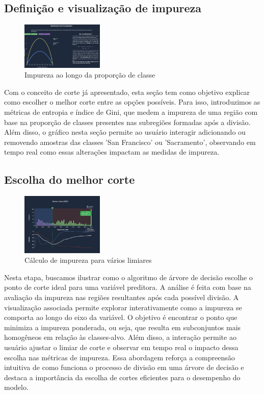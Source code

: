 \documentclass[conference]{IEEEtran}
\begin{document}
\subsection{Definição e visualização de impureza}
\begin{figure}[h]
    \centering
    \includegraphics[width=0.35\textwidth]{gini.png}
    \caption{Impureza ao longo da proporção de classe}
    \label{fig:minha_imagem}
\end{figure}
    Com o conceito de corte já apresentado, esta seção tem como objetivo explicar como escolher o melhor corte entre as opções possíveis. Para isso, introduzimos as métricas de entropia e índice de Gini, que medem a impureza de uma região com base na proporção de classes presentes nas subregiões formadas após a divisão. Além disso, o gráfico nesta seção permite ao usuário interagir adicionando ou removendo amostras das classes 'San Francisco' ou 'Sacramento', observando em tempo real como essas alterações impactam as medidas de impureza.

    
\subsection{Escolha do melhor corte}

\begin{figure}[h]
    \centering
    \includegraphics[width=0.35\textwidth]{unicut.png}
    \caption{Cálculo de impureza para vários limiares}
    \label{fig:minha_imagem}
\end{figure}
   Nesta etapa, buscamos ilustrar como o algoritmo de árvore de decisão escolhe o ponto de corte ideal para uma variável preditora. A análise é feita com base na avaliação da impureza nas regiões resultantes após cada possível divisão.
    A visualização associada permite explorar interativamente como a impureza se comporta ao longo do eixo da variável. O objetivo é encontrar o ponto que minimiza a impureza ponderada, ou seja, que resulta em subconjuntos mais homogêneos em relação às classes-alvo. Além disso, a interação permite ao usuário ajustar o limiar de corte e observar em tempo real o impacto dessa escolha nas métricas de impureza.
    Essa abordagem reforça a compreensão intuitiva de como funciona o processo de divisão em uma árvore de decisão e destaca a importância da escolha de cortes eficientes para o desempenho do modelo.
\end{document}
